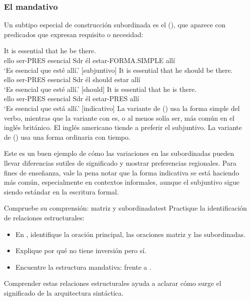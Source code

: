 \subsubsection*{El mandativo}

Un subtipo especial de construcción subordinada es el  (), que aparece con predicados que expresan requisito o necesidad:

\ea \label{ex:mandative-es}
    \ea \gll It is essential {\ob}that he be there{\cb}.\\
        ello ser-PRES esencial Sdr él estar-FORMA.SIMPLE allí\\
    \glt `Es esencial que esté allí.' [subjuntivo]
    \ex \gll It is essential {\ob}that he should be there{\cb}.\\
        ello ser-PRES esencial Sdr él should estar allí\\
    \glt `Es esencial que esté allí.' [should]
    \ex \gll It is essential {\ob}that he is there{\cb}.\\
        ello ser-PRES esencial Sdr él estar-PRES allí\\
    \glt `Es esencial que está allí.' [indicativo]
    \z
\z
La variante de  () usa la forma simple del verbo, mientras que la variante con  es, o al menos solía ser, más común en el inglés británico. El inglés americano tiende a preferir el subjuntivo. La variante de  () usa una forma ordinaria con tiempo.

Este es un buen ejemplo de cómo las variaciones en las subordinadas pueden llevar diferencias sutiles de significado y mostrar preferencias regionales. Para fines de enseñanza, vale la pena notar que la forma indicativa se está haciendo más común, especialmente en contextos informales, aunque el subjuntivo sigue siendo estándar en la escritura formal.

\begin{tblsframedsymbol}{Compruebe su comprensión: matriz y subordinada}{test}
Practique la identificación de relaciones estructurales:
\begin{itemize}[noitemsep, leftmargin=*]
    \item En , identifique la oración principal, las oraciones matriz y las subordinadas.
    \item Explique por qué  no tiene inversión pero  sí.
    \item Encuentre la estructura mandativa:  frente a .
\end{itemize}
Comprender estas relaciones estructurales ayuda a aclarar cómo surge el significado de la arquitectura sintáctica.
\end{tblsframedsymbol}

